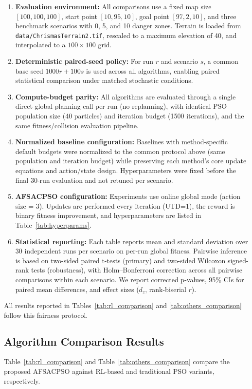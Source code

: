 \documentclass[final,5p,times]{elsarticle}
\begin{document}
\begin{enumerate} \item \textbf{Evaluation environment:} All comparisons use a fixed map size $[100,100,100]$, start point $[10,95,10]$, goal point $[97,2,10]$, and three benchmark scenarios with 0, 5, and 10 danger zones. Terrain is loaded from \texttt{data/ChrismasTerrain2.tif}, rescaled to a maximum elevation of 40, and interpolated to a $100\times100$ grid. \item \textbf{Deterministic paired-seed policy:} For run $r$ and scenario $s$, a common base seed $1000r + 100s$ is used across all algorithms, enabling paired statistical comparison under matched stochastic conditions. \item \textbf{Compute-budget parity:} All algorithms are evaluated through a single direct global-planning call per run (no replanning), with identical PSO population size (40 particles) and iteration budget (1500 iterations), and the same fitness/collision evaluation pipeline. \item \textbf{Normalized baseline configuration:} Baselines with method-specific default budgets were normalized to the common protocol above (same population and iteration budget) while preserving each method's core update equations and action/state design. Hyperparameters were fixed before the final 30-run evaluation and not retuned per scenario. \item \textbf{AFSACPSO configuration:} Experiments use online global mode (action size = 3). Updates are performed every iteration (UTD=1), the reward is binary fitness improvement, and hyperparameters are listed in Table~\ref{tab:hyperparams}. \item \textbf{Statistical reporting:} Each table reports mean and standard deviation over 30 independent runs per scenario on per-run global fitness. Pairwise inference is based on two-sided paired t-tests (primary) and two-sided Wilcoxon signed-rank tests (robustness), with Holm--Bonferroni correction across all pairwise comparisons within each scenario. We report corrected p-values, 95\% CIs for paired mean differences, and effect sizes ($d_z$, rank-biserial $r$).
\end{enumerate} All results reported in Tables~\ref{tab:rl_comparison} and \ref{tab:others_comparison} follow this fairness protocol. \subsection{Algorithm Comparison Results} Table~\ref{tab:rl_comparison} and Table~\ref{tab:others_comparison} compare the proposed AFSACPSO against RL-based and traditional PSO variants, respectively.
\end{document}
